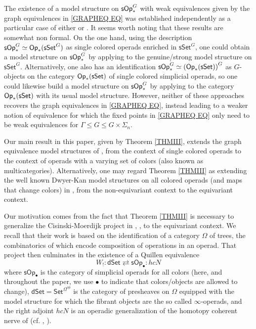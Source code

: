 \documentclass[a4paper,10pt
,draft
]{article}%
\numberwithin{equation}{section}
\numberwithin{figure}{section}
\theoremstyle{definition} %
\newcommand{\1}{\ensuremath{\mathbbm 1}}%
\begin{document}
The existence of a model structure 
on $\mathsf{sOp}^G_{\**}$
with weak equivalences given by the graph equivalences
in \eqref{GRAPHEQ EQ}
was established independently as a particular case of either
\cite[Thm. I]{BP_geo} or \cite[Thm. 3.1]{GW18}.
It seems worth noting that these results are somewhat non formal.
On the one hand, using the description 
$\mathsf{sOp}_{\**}^G \simeq \mathsf{Op}_{\**}(\mathsf{sSet}^G)$
as single colored operads enriched in 
$\mathsf{sSet}^G$,
one could obtain a model structure
on $\mathsf{sOp}_{\**}^G$
by applying \cite[Thm. 3.2]{BM03}
to the genuine/strong model structure on $\mathsf{sSet}^G$.
Alternatively, one also has an identification
$\mathsf{sOp}_{\**}^G \simeq 
\left(\mathsf{Op}_{\**}(\mathsf{sSet})\right)^G$
as $G$-objects on the category
$\mathsf{Op}_{\**}(\mathsf{sSet})$
of single colored simplicial operads,
so one could likewise build a model structure on 
$\mathsf{sOp}_{\**}^G$
by applying \cite[Prop. 2.6]{Ste16}
to the category
$\mathsf{Op}_{\**}(\mathsf{sSet})$
with its usual model structure.
However, neither of these approaches
recovers the graph equivalences in \eqref{GRAPHEQ EQ},
instead leading to a weaker notion of equivalence for which the fixed points in \eqref{GRAPHEQ EQ}
only need to be weak equivalences for
$\Gamma \leq G \leq G \times \Sigma_n$.


Our main result in this paper, 
given by Theorem \ref{THMIII}, 
extends the graph equivalence model structures of
\cite[Thm. I]{BP_geo}, \cite[Thm. 3.1]{GW18}
from the context of single colored operads 
to the context of operads with a varying set of colors
(also known as multicategories).
Alternatively, one may regard Theorem \ref{THMIII} as extending the well known Dwyer-Kan model structures on all colored operads (and maps that change colors) in
\cite[Thm 1.14]{CM13b}, \cite[Thm. 2]{Rob11}
from the non-equivariant context to the 
equivariant context.


Our motivation comes from the fact that 
Theorem \ref{THMIII} is necessary to 
generalize the Cisinski-Moerdijk project in
\cite{CM11}, \cite{CM13a}, \cite{CM13b} to the equivariant context.
We recall that their work is based on the identification of a category
$\Omega$ of trees, 
the combinatorics of which encode
composition of operations in an operad.
That project then culminates in the existence of a Quillen equivalence
\begin{equation}\label{CMMAINTHM EQ}
	W_!\colon \mathsf{dSet} \rightleftarrows \mathsf{sOp}_{\bullet} \colon hcN
\end{equation}
where 
$\mathsf{sOp}_{\bullet}$
is the category of simplicial operads for all colors
(here, and throughout the paper, we use $\bullet$ to indicate 
that colors/objects are allowed to change),
$\mathsf{dSet} = \mathsf{Set}^{\Omega^{op}}$
is the category of presheaves on $\Omega$
equipped with the model structure for which the fibrant objects are the so called $\infty$-operads,
and the right adjoint $hcN$ is an operadic generalization of the homotopy coherent nerve of \cite{Cor82} (cf. \cite{Joy}, \cite[\S 1.1.5]{Lur09}).
\end{document}
